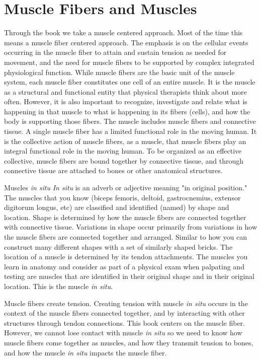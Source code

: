 \section{Muscle Fibers and Muscles}
Through the book we take a muscle centered approach. Most of the time this means a muscle fiber centered approach. The emphasis is on the cellular events occurring in the muscle fiber to attain and sustain tension as needed for movement, and the need for muscle fibers to be supported by complex integrated physiological function. While muscle fibers are the basic unit of the muscle system, each muscle fiber constitutes one cell of an entire muscle. It is the muscle as a structural and functional entity that physical therapists think about more often. However, it is also important to recognize, investigate and relate what is happening in that muscle to what is happening in its fibers (cells), and how the body is supporting those fibers. The muscle includes muscle fibers and connective tissue. A single muscle fiber has a limited functional role in the moving human. It is the collective action of muscle fibers, as a muscle, that muscle fibers play an integral functional role in the moving human. To be organized as an effective collective, muscle fibers are bound together by connective tissue, and through connective tissue are attached to bones or other anatomical structures. 

\begin{backgroundinformation}{Muscles \textit{in situ}}
    \textit{In situ} is an adverb or adjective meaning "in original position." The muscles that you know (biceps femoris, deltoid, gastrocnemius, extensor digitorum longus, etc) are classified and identified (named) by shape and location. Shape is determined by how the muscle fibers are connected together with connective tissue. Variations in shape occur primarily from variations in how the muscle fibers are connected together and arranged. Similar to how you can construct many different shapes with a set of similarly shaped bricks. The location of a muscle is determined by its tendon attachments. The muscles you learn in anatomy and consider as part of a physical exam when palpating and testing are muscles that are identified in their original shape and in their original location. This is the muscle \textit{in situ}.

    Muscle fibers create tension. Creating tension with muscle \textit{in situ} occurs in the context of the muscle fibers connected together, and by interacting with other structures through tendon connections. This book centers on the muscle fiber. However, we cannot lose contact with muscle \textit{in situ} so we need to know how muscle fibers come together as muscles, and how they transmit tension to bones, and how the muscle \textit{in situ}  impacts the muscle fiber.
\end{backgroundinformation}

